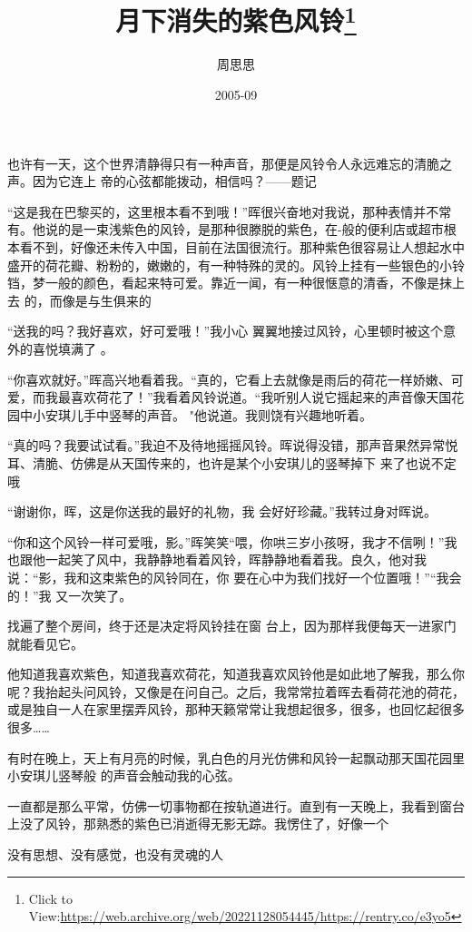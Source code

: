 \documentclass{article}
\title{月下消失的紫色风铃\footnote{Click to View:\url{https://web.archive.org/web/20221128054445/https://rentry.co/e3yo5}}}
\author{周思思}
\date{2005-09}
\begin{document}

\maketitle


\Large

﻿也许有一天，这个世界清静得只有一种声音，那便是风铃令人永远难忘的清脆之声。因为它连上
帝的心弦都能拨动，相信吗？——题记 

“这是我在巴黎买的，这里根本看不到哦！”晖很兴奋地对我说，那种表情并不常有。他说的是一束浅紫色的风铃，是那种很滕脱的紫色，在-般的便利店或超市根本看不到，好像还未传入中国，目前在法国很流行。那种紫色很容易让人想起水中盛开的荷花瓣、粉粉的，嫩嫩的，有一种特殊的灵的。风铃上挂有一些银色的小铃铛，梦一般的颜色，看起来特可爱。靠近一闻，有一种很惬意的清香，不像是抹上去
的，而像是与生俱来的 

“送我的吗？我好喜欢，好可爱哦！”我小心
\newpage
翼翼地接过风铃，心里顿时被这个意外的喜悦填满了
。 

“你喜欢就好。”晖高兴地看着我。“真的，它看上去就像是雨后的荷花一样娇嫩、可爱，而我最喜欢荷花了！”我看着风铃说道。“我听别人说它摇起来的声音像天国花园中小安琪儿手中竖琴的声音。
"他说道。我则饶有兴趣地听着。 

“真的吗？我要试试看。”我迫不及待地摇摇风铃。晖说得没错，那声音果然异常悦耳、清脆、仿佛是从天国传来的，也许是某个小安琪儿的竖琴掉下
来了也说不定哦 

“谢谢你，晖，这是你送我的最好的礼物，我
会好好珍藏。”我转过身对晖说。 

“你和这个风铃一样可爱哦，影。”晖笑笑“喂，你哄三岁小孩呀，我才不信咧！”我也跟他一起笑了风中，我静静地看着风铃，晖静静地看着我。良久，他对我说：“影，我和这束紫色的风铃同在，你
\newpage
要在心中为我们找好一个位置哦！”“我会的！”我
又一次笑了。 

找遍了整个房间，终于还是决定将风铃挂在窗
台上，因为那样我便每天一进家门就能看见它。 

他知道我喜欢紫色，知道我喜欢荷花，知道我喜欢风铃他是如此地了解我，那么你呢？我抬起头问风铃，又像是在问自己。之后，我常常拉着晖去看荷花池的荷花，或是独自一人在家里摆弄风铃，那种天籁常常让我想起很多，很多，也回忆起很多很多……
 

有时在晚上，天上有月亮的时候，乳白色的月光仿佛和风铃一起飘动那天国花园里小安琪儿竖琴般
的声音会触动我的心弦。 

一直都是那么平常，仿佛一切事物都在按轨道进行。直到有一天晚上，我看到窗台上没了风铃，那熟悉的紫色已消逝得无影无踪。我愣住了，好像一个

\newpage
没有思想、没有感觉，也没有灵魂的人 
\end{document}
